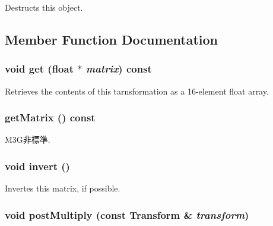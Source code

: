 Destructs this object. 

\subsection{Member Function Documentation}
\hypertarget{classm3g_1_1Transform_f78faf7dcc06f53604ad08965babb7b3}{
\subsubsection[{get}]{\setlength{\rightskip}{0pt plus 5cm}void get (float $\ast$ {\em matrix}) const}}
\label{classm3g_1_1Transform_f78faf7dcc06f53604ad08965babb7b3}


Retrieves the contents of this tarnsformation as a 16-element float array. \hypertarget{classm3g_1_1Transform_3ab68d9aa9eafd77e47631467de93f6f}{
\subsubsection[{getMatrix}]{ getMatrix () const}}
\label{classm3g_1_1Transform_3ab68d9aa9eafd77e47631467de93f6f}


M3G非標準. \hypertarget{classm3g_1_1Transform_7fa1616cc61c19a5efcc863c950f7f30}{
\subsubsection[{invert}]{\setlength{\rightskip}{0pt plus 5cm}void invert ()}}
\label{classm3g_1_1Transform_7fa1616cc61c19a5efcc863c950f7f30}


Invertes this matrix, if possible. \hypertarget{classm3g_1_1Transform_ad6083d90dbecc7e5bb39d5062723a0d}{
\subsubsection[{postMultiply}]{\setlength{\rightskip}{0pt plus 5cm}void postMultiply (const {\bf Transform} \& {\em transform})}}
\label{classm3g_1_1Transform_ad6083d90dbecc7e5bb39d5062723a0d}



